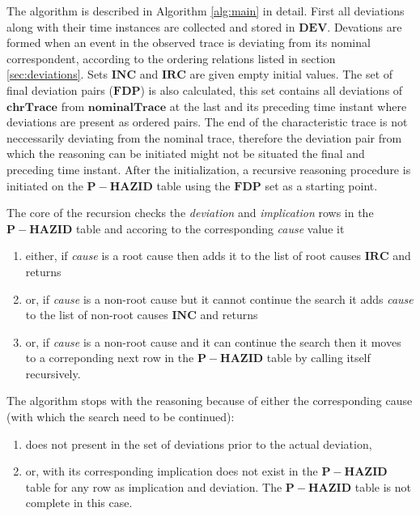 \documentclass[conference]{IEEEtran}
\begin{document}
The algorithm is described in Algorithm \ref{alg:main} in detail. First all deviations along with their time instances are collected and stored in $\mathbf{DEV}$. Devations are formed when an event in the observed trace is deviating from its nominal correspondent, according to the ordering relations listed in section \ref{sec:deviations}. Sets $\mathbf{INC}$ and $\mathbf{IRC}$ are given empty initial values. The set of final deviation pairs ($\mathbf{FDP}$) is also calculated, this set contains all deviations of $\mathbf{chrTrace}$ from $\mathbf{nominalTrace}$ at the last and its preceding time instant where deviations are present as ordered pairs. The end of the characteristic trace is not neccessarily deviating from the nominal trace, therefore the deviation pair from which the reasoning can be initiated might not be situated the final and preceding time instant. After the initialization, a recursive reasoning procedure is initiated on the $\mathbf{P-HAZID}$ table using the $\mathbf{FDP}$ set as a starting point.

The core of the recursion checks the \textit{deviation} and \textit{implication} rows in the $\mathbf{P-HAZID}$ table and accoring to the corresponding \textit{cause} value it
\begin{enumerate}
\item either, if \textit{cause} is a root cause then adds it to the list of root causes $\mathbf{IRC}$ and returns
\item or, if \textit{cause} is a non-root cause but it cannot continue the search it adds \textit{cause} to the list of non-root causes $\mathbf{INC}$ and returns
\item or, if \textit{cause} is a non-root cause and it can continue the search then it moves to a correponding next row in the $\mathbf{P-HAZID}$ table by calling itself recursively.
\end{enumerate}

The algorithm stops with the reasoning because of either the corresponding cause (with which the search need to be continued):
\begin{enumerate}
\item does not present in the set of deviations prior to the actual deviation,
\item or, with its corresponding implication does not exist in the $\mathbf{P-HAZID}$ table for any row as implication and deviation. The $\mathbf{P-HAZID}$ table is not complete in this case.
\end{enumerate}
\end{document}
